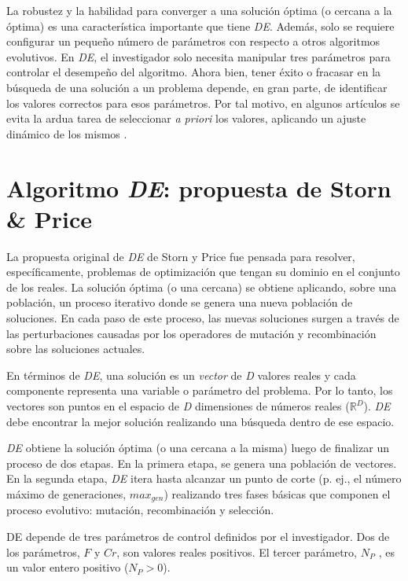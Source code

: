 La robustez y la habilidad para converger a una solución óptima (o cercana a la óptima) es una característica importante que tiene \textit{DE}. Además, solo se requiere configurar un pequeño número de parámetros con respecto a otros algoritmos evolutivos. En \textit{DE}, el investigador solo necesita manipular tres parámetros para controlar el desempeño del algoritmo. Ahora bien, tener éxito o fracasar en la búsqueda de una solución a un problema depende, en gran parte, de identificar los valores correctos para esos parámetros. Por tal motivo, en algunos artículos se evita la ardua tarea de seleccionar \textit{a priori} los valores, aplicando un ajuste dinámico de los mismos \cite{QinSuganthan, BrestGreinerBoskovicMernik}.


\section{Algoritmo \textit{DE}: propuesta de Storn \& Price}


La propuesta original de \textit{DE} de Storn y Price \cite{PriceStornLampinen} fue pensada para resolver, específicamente, problemas de optimización que tengan su dominio en el conjunto de los reales. La solución óptima (o una cercana) se obtiene aplicando, sobre una población, un proceso iterativo donde se genera una nueva población de soluciones. En cada paso de este proceso, las nuevas soluciones surgen a través de las perturbaciones causadas por los operadores de mutación y recombinación sobre las soluciones actuales.


En términos de \textit{DE}, una solución es un \textit{vector} de \textit{D} valores reales y cada componente representa una variable o parámetro del problema. Por lo tanto, los vectores son puntos en el espacio de \textit{D} dimensiones de números reales ($\mathbb{R}^{D}$). \textit{DE} debe encontrar la mejor solución realizando una búsqueda dentro de ese espacio.


\textit{DE} obtiene la solución óptima (o una cercana a la misma) luego de finalizar un proceso de dos etapas. En la primera etapa, se genera una población de vectores. En la segunda etapa, \textit{DE} itera hasta alcanzar un punto de corte (p. ej., el número máximo de generaciones, $max_{gen}$) realizando tres fases básicas que componen el proceso evolutivo: mutación, recombinación y selección.


DE depende de tres parámetros de control definidos por el investigador. Dos de los parámetros, $F$ y $Cr$, son valores reales positivos. El tercer parámetro, $N_P$ , es un valor entero positivo ($N_P > 0$).


